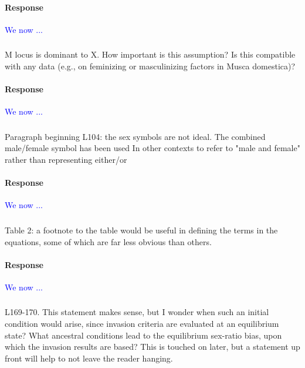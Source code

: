 \documentclass[10pt,letterpaper]{article}
\begin{document}
\noindent\paragraph{Response}
\textcolor{blue}{We now ...}

\noindent\subsubsection{}
M locus is dominant to X. How important is this assumption? Is this compatible with any data (e.g., on feminizing or masculinizing factors in Musca domestica)?

\noindent\paragraph{Response}
\textcolor{blue}{We now ...}

\noindent\subsubsection{}
Paragraph beginning L104: the sex symbols are not ideal. The combined male/female symbol has been used In other contexts to refer to "male and female" rather than representing either/or

\noindent\paragraph{Response}
\textcolor{blue}{We now ...}

\noindent\subsubsection{}
Table 2: a footnote to the table would be useful in defining the terms in the equations, some of which are far less obvious than others.

\noindent\paragraph{Response}
\textcolor{blue}{We now ...}

\noindent\subsubsection{}
L169-170. This statement makes sense, but I wonder when such an initial condition would arise, since invasion criteria are evaluated at an equilibrium state? What ancestral conditions lead to the equilibrium sex-ratio bias, upon which the invasion results are based? This is touched on later, but a statement up front will help to not leave the reader hanging.
\end{document}

